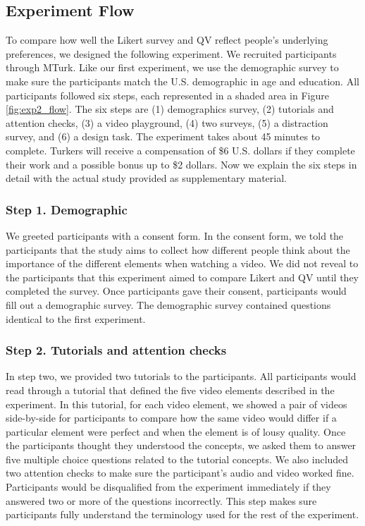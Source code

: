 \subsection{Experiment Flow}

To compare how well the Likert survey and QV reflect people's underlying preferences, we designed the following experiment. We recruited participants through MTurk. Like our first experiment, we use the demographic survey to make sure the participants match the U.S. demographic in age and education. All participants followed six steps, each represented in a shaded area in Figure \ref{fig:exp2_flow}. The six steps are (1) demographics survey, (2) tutorials and attention checks, (3) a video playground, (4) two surveys, (5) a distraction survey, and (6) a design task. The experiment takes about 45 minutes to complete. Turkers will receive a compensation of \$6 U.S. dollars if they complete their work and a possible bonus up to \$2 dollars. Now we explain the six steps in detail with the actual study provided as supplementary material.

\subsubsection{Step 1. Demographic}
We greeted participants with a consent form. In the consent form, we told the participants that the study aims to collect how different people think about the importance of the different elements when watching a video. We did not reveal to the participants that this experiment aimed to compare Likert and QV until they completed the survey. Once participants gave their consent, participants would fill out a demographic survey. The demographic survey contained questions identical to the first experiment.

\subsubsection{Step 2. Tutorials and attention checks}
In step two, we provided two tutorials to the participants. All participants would read through a tutorial that defined the five video elements described in the experiment. In this tutorial, for each video element, we showed a pair of videos side-by-side for participants to compare how the same video would differ if a particular element were perfect and when the element is of lousy quality. Once the participants thought they understood the concepts, we asked them to answer five multiple choice questions related to the tutorial concepts. We also included two attention checks to make sure the participant's audio and video worked fine. Participants would be disqualified from the experiment immediately if they answered two or more of the questions incorrectly. This step makes sure participants fully understand the terminology used for the rest of the experiment.

